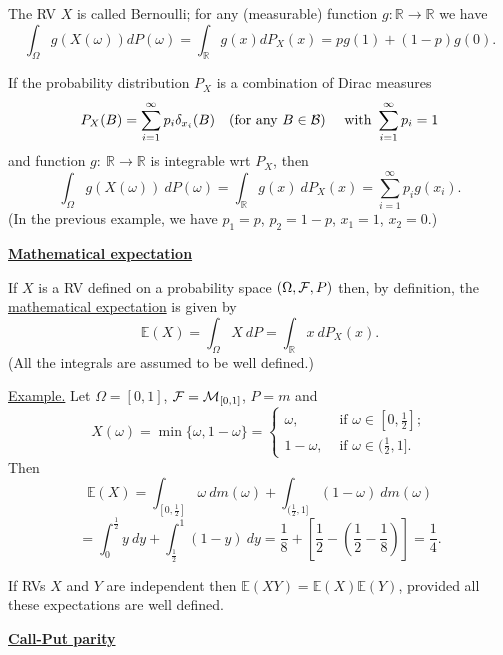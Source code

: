 \documentclass[a4paper,10pt]{article}
\def\RR{\mathbb{R}}
\def\EE{\mathbb{E}}
\newcommand{\1}[1]{\mathbf{1}_{\{#1\}}}
\begin{document}
The RV $X$ is called Bernoulli; for any (measurable) function $g:\RR\to\RR$ we have
  $$\int_\Omega g(X(\omega))dP(\omega)=\int_\RR g(x) dP_X(x)=pg(1)+(1-p)g(0).$$
\vspace{3mm}

If the probability distribution $P_X$ is a combination of Dirac measures
  $$P_X(B)=\sum_{i=1}^\infty p_i\delta_{x_i}(B)~~~(\mbox{for any } B\in{\cal B})~~~\mbox{ with } \sum_{i=1}^\infty p_i=1$$
and function $g:~\RR\to \RR$ is integrable wrt $P_X$, then
  $$\int_\Omega g(X(\omega))~dP(\omega)=\int_\RR g(x)~dP_X(x)=\sum_{i=1}^\infty p_i g(x_i).$$
(In the previous example, we have $p_1=p$, $p_2=1-p$, $x_1=1$, $x_2=0$.)
 \vspace{3mm}

\begin{center}\bf\underline{Mathematical expectation} \end{center}\vspace{5mm}

If $X$ is a RV defined on a probability space $(\Omega,{\cal F},P)$ then, by definition, the \underline{mathematical expectation} is given by
  $$\EE(X)=\int_\Omega X~dP=\int_\RR x~dP_X(x).$$
(All the integrals are assumed to be well defined.)\vspace{3mm}

\underline{Example.}
Let $\Omega=[0,1]$, ${\cal F}={\cal M}_{[0,1]}$, $P=m$ and
  $$X(\omega)=\min\{\omega,1-\omega\}=\left\{\begin{array}{rl}
\omega, & \mbox{ if } \omega\in[0,\frac{1}{2}]; \\  1-\omega, & \mbox{ if } \omega\in(\frac{1}{2},1]. \end{array}\right.$$
Then
  $$\EE(X)=\int_{[0,\frac{1}{2}]} \omega~dm(\omega)+\int_{(\frac{1}{2},1]} (1-\omega) ~dm(\omega)$$
  $$=\int_0^{\frac{1}{2}} y~dy+\int_{\frac{1}{2}}^1(1-y)~dy=\frac{1}{8}+\left[\frac{1}{2}-\left(\frac{1}{2}-\frac{1}{8}\right)\right]=\frac{1}{4}.$$
\vspace{3mm}

If RVs $X$ and $Y$ are independent then $\EE(XY)=\EE(X)\EE(Y)$, provided all these expectations are well defined.
 \vspace{3mm}

\begin{center}\bf\underline{Call-Put parity} \end{center}\vspace{3mm}
\end{document}
